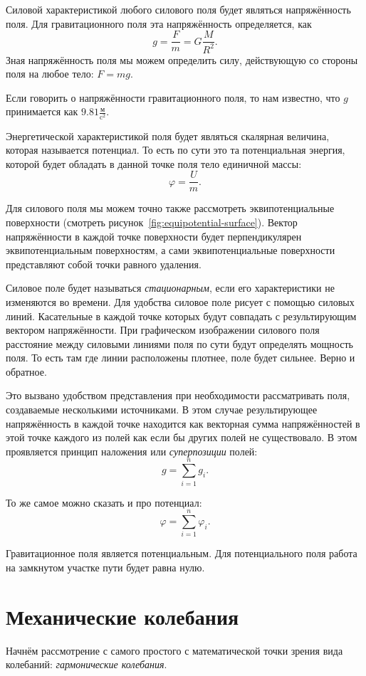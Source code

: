 Силовой характеристикой любого силового поля будет являться напряжённость поля.
Для гравитационного поля эта напряжённость определяется, как \[
	g = \frac{F}{m} = G \frac{M}{R^2}
	.\] Зная напряжённость поля мы можем определить силу, действующую со стороны
поля на любое тело: \( F = m g \).

Если говорить о напряжённости гравитационного поля, то нам известно, что $g$
принимается как $9.81 \frac{\text{м}}{\text{c}^2}$.

Энергетической характеристикой поля будет являться скалярная величина, которая
называется потенциал. То есть по сути это та потенциальная энергия, которой
будет обладать в данной точке поля тело единичной массы: \[
	\varphi = \frac{U}{m}
	.\]

Для силового поля мы можем точно также рассмотреть эквипотенциальные
поверхности (смотреть рисунок~\ref{fig:equipotential-surface}). Вектор
напряжённости в каждой точке поверхности будет перпендикулярен
эквипотенциальным поверхностям, а сами эквипотенциальные поверхности
представляют собой точки равного удаления.

Силовое поле будет называться \emph{стационарным}, если его характеристики не
изменяются во времени. Для удобства силовое поле рисует с помощью силовых
линий. Касательные в каждой точке которых будут совпадать с результирующим
вектором напряжённости. При графическом изображении силового поля расстояние
между силовыми линиями поля по сути будут определять мощность поля. То есть там
где линии расположены плотнее, поле будет сильнее. Верно и обратное.

Это вызвано удобством представления при необходимости рассматривать поля,
создаваемые несколькими источниками. В этом случае результирующее напряжённость
в каждой точке находится как векторная сумма напряжённостей в этой точке
каждого из полей как если бы других полей не существовало. В этом проявляется
принцип наложения или \emph{суперпозиции} полей: \[
	g = \sum_{i=1}^{n} g_i
	.\]

То же самое можно сказать и про потенциал: \[
	\varphi = \sum_{i=1}^{n} \varphi_i
	.\]

Гравитационное поля является потенциальным. Для потенциального поля работа на
замкнутом участке пути будет равна нулю.

\chapter{Механические колебания}

Начнём рассмотрение с самого простого с математической точки зрения вида
колебаний: \emph{гармонические колебания}.

